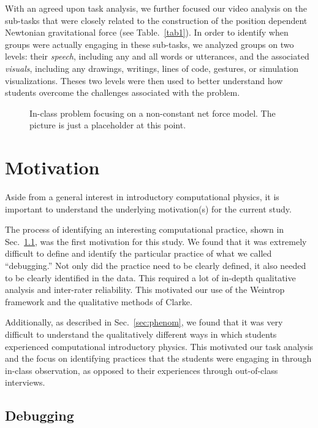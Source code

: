 \documentclass{msuphddissertation}
\begin{document}
\begin{doublespace}
With an agreed upon task analysis, we further focused our video analysis on the sub-tasks that were closely related to the construction of the position dependent Newtonian gravitational force (see Table.~\ref{tab1}).  In order to identify when groups were actually engaging in these sub-tasks, we analyzed groups on two levels: their \textit{speech}, including any and all words or utterances, and the associated \textit{visuals}, including any drawings, writings, lines of code, gestures, or simulation visualizations.  Theses two levels were then used to better understand how students overcome the challenges associated with the problem.

\begin{figure}[ht]\centering
\caption{In-class problem focusing on a non-constant net force model.  The picture is just a placeholder at this point.}
\end{figure}

%
%

\chapter{Motivation}

Aside from a general interest in introductory computational physics, it is important to understand the underlying motivation(s) for the current study.

The process of identifying an interesting computational practice, shown in Sec.~\ref{sec:debug}, was the first motivation for this study.  We found that it was extremely difficult to define and identify the particular practice of what we called ``debugging.''  Not only did the practice need to be clearly defined, it also needed to be clearly identified in the data.  This required a lot of in-depth qualitative analysis and inter-rater reliability.  This motivated our use of the Weintrop framework and the qualitative methods of Clarke.

Additionally, as described in Sec.~\ref{sec:phenom}, we found that it was very difficult to understand the qualitatively different ways in which students experienced computational introductory physics.  This motivated our task analysis and the focus on identifying practices that the students were engaging in through in-class observation, as opposed to their experiences through out-of-class interviews.  
  
\section{Debugging}\label{sec:debug}


\end{doublespace}
\end{document}
